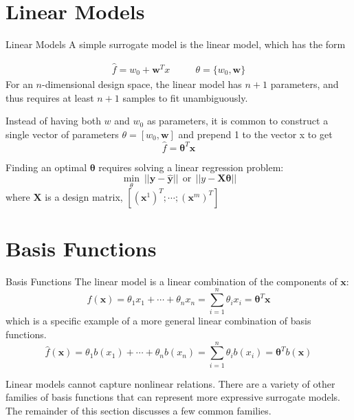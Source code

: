 \documentclass{beamer}
\begin{document}
\section{Linear Models}
\begin{frame}{Linear Models}
A simple surrogate model is the linear model, which has the form

\begin{gather*}
    \hat{f} = w_0 + \boldsymbol{w}^T x ~~~~~~~~~~~~ \theta= \{w_0, \boldsymbol{w}\}
\end{gather*}
For an $n$-dimensional design space, the linear model has $n+1$ parameters, and thus requires at least $n+1$ samples to fit unambiguously.

Instead of having both $w$ and $w_0$ as parameters, it is common to construct a single vector of parameters $\theta = [w_0, \boldsymbol{w}]$ and prepend 1 to the vector x to get
\begin{equation*}
    \hat{f} = \boldsymbol{\theta}^T \boldsymbol{x}
\end{equation*}

Finding an optimal $\boldsymbol{\theta}$ requires solving a linear regression problem:
\begin{equation*}
    \underset{\theta}{\min}~||\boldsymbol{y}-\hat{\boldsymbol{y}}|| ~~\textrm{or}~~ ||y-\boldsymbol{X\theta}||
\end{equation*}
where $\boldsymbol{X}$ is a design matrix, $[(\boldsymbol{x}^1)^T; \cdots; (\boldsymbol{x}^m)^T]$

\end{frame}

\section{Basis Functions}
\begin{frame}{Basis Functions}
The linear model is a linear combination of the components of $\boldsymbol{x}$:
\begin{equation*}
    \hat{f}(\boldsymbol{x}) = \theta_1 x_1 + \cdots + \theta_n x_n = \sum_{i=1}^n \theta_i x_i = \boldsymbol{\theta}^T \boldsymbol{x}
\end{equation*}
which is a specific example of a more general linear combination of basis functions.
\begin{equation*}
     \hat{f}(\boldsymbol{x}) = \theta_1 b(x_1) + \cdots + \theta_n b(x_n) = \sum_{i=1}^n \theta_i b(x_i) = \boldsymbol{\theta}^T b(\boldsymbol{x})
\end{equation*}

Linear models cannot capture nonlinear relations. There are a variety of other families of basis functions that can represent more expressive surrogate models. The remainder of this section discusses a few common families.

\end{frame}
\end{document}
